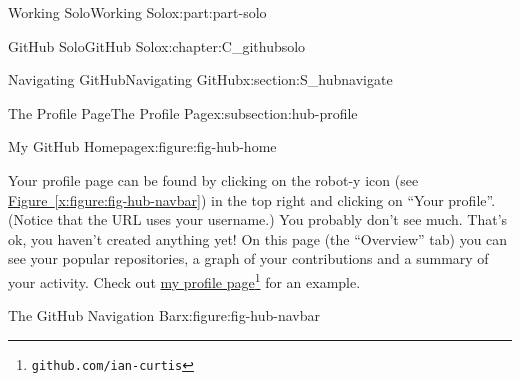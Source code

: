 \documentclass[oneside,10pt,]{book}
\newcommand{\xreffont}{\relax}
\begin{document}
\begin{partptx}{Working Solo}{}{Working Solo}{}{}{x:part:part-solo}
\begin{chapterptx}{GitHub Solo}{}{GitHub Solo}{}{}{x:chapter:C_githubsolo}
\begin{sectionptx}{Navigating GitHub}{}{Navigating GitHub}{}{}{x:section:S_hubnavigate}
\begin{subsectionptx}{The Profile Page}{}{The Profile Page}{}{}{x:subsection:hub-profile}
\begin{figureptx}{My GitHub Homepage}{x:figure:fig-hub-home}{}
\begin{image}{0.05}{0.9}{0.05}
\end{image}%
\tcblower
\end{figureptx}%
Your profile page can be found by clicking on the robot-y icon (see \hyperref[x:figure:fig-hub-navbar]{Figure~{\xreffont\ref{x:figure:fig-hub-navbar}}}) in the top right and clicking on ``Your profile''. (Notice that the URL uses your username.) You probably don't see much. That's ok, you haven't created anything yet! On this page (the ``Overview'' tab) you can see your popular repositories, a graph of your contributions and a summary of your activity. Check out \href{https://github.com/ian-curtis}{my profile page}\footnote{\nolinkurl{github.com/ian-curtis}\label{g:fn:idm480353016}} for an example.%
\begin{figureptx}{The GitHub Navigation Bar}{x:figure:fig-hub-navbar}{}%
\begin{image}{0.35}{0.3}{0.35}%

\end{image}
\end{figureptx}
\end{subsectionptx}
\end{sectionptx}
\end{chapterptx}
\end{partptx}
\end{document}
